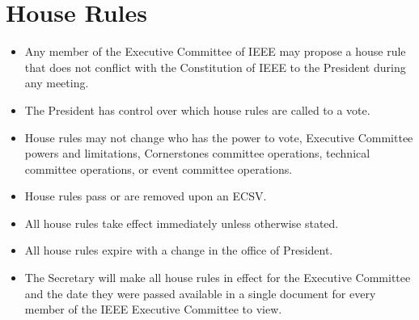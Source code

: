 \documentclass[12pt]{constitution}
\begin{document}
\section{House Rules}
\label{sec:house_rules}
\begin{itemize}
\item Any member of the Executive Committee of IEEE may propose a house rule that does not conflict with the Constitution of IEEE to the President during any meeting.
\item The President has control over which house rules are called to a vote.
\item House rules may not change who has the power to vote, Executive Committee powers and limitations, Cornerstones committee operations, technical committee operations, or event committee operations.
\item House rules pass or are removed upon an ECSV.
\item All house rules take effect immediately unless otherwise stated.
\item All house rules expire with a change in the office of President.
\item The Secretary will make all house rules in effect for the Executive Committee and the date they were passed available in a single document for every member of the IEEE Executive Committee to view.
\end{itemize}
\end{document}
